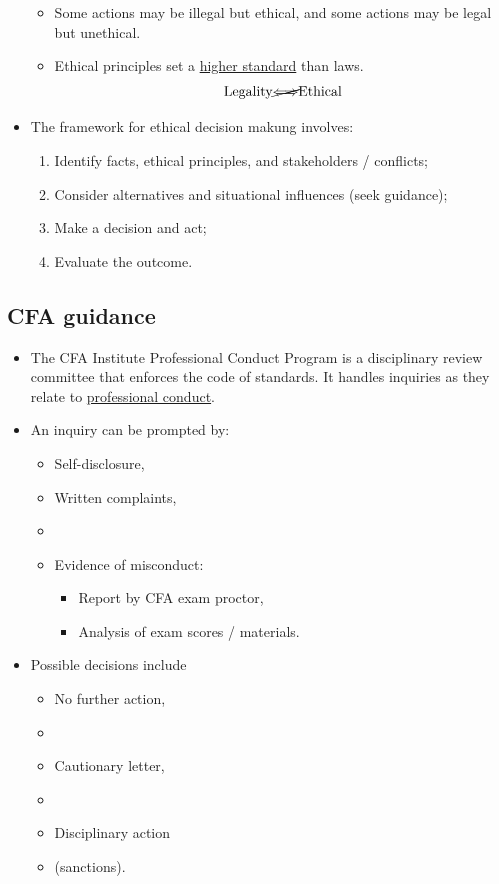 \documentclass[../notes_compiled.tex]{subfiles}
\begin{document}
\begin{itemize}
\begin{itemize}
\item Some actions may be illegal but ethical, and some actions may be legal but unethical.
\item[] Ethical principles set a \underline{higher standard} than laws.
\begin{equation*}
\text{Legality}\cancel\Longleftrightarrow\text{Ethical}
\end{equation*}
\end{itemize}
\item The framework for ethical decision makung involves:
\begin{enumerate}
\item Identify facts, ethical principles, and stakeholders / conflicts;
\item Consider alternatives and situational influences (seek guidance);
\item Make a decision and act;
\item Evaluate the outcome.
\end{enumerate}
\end{itemize}

\subsection{CFA guidance}
\begin{itemize}
\item The CFA Institute Professional Conduct Program is a disciplinary review committee that enforces the code of standards. It handles inquiries as they relate to \underline{professional conduct}.
\item An inquiry can be prompted by:
\begin{multicols}{2}
\begin{itemize}
\item Self-disclosure,
\item Written complaints,
\item[]
\item Evidence of misconduct:
\begin{itemize}
\item Report by CFA exam proctor,
\item Analysis of exam scores / materials.
\end{itemize}
\end{itemize}
\end{multicols}
\item Possible decisions include
\begin{multicols}{3}
\begin{itemize}
\item No further action,
\item[]
\item Cautionary letter,
\item[]
\item Disciplinary action
\item[] (sanctions).
\end{itemize}
\end{multicols}
\end{itemize}
\end{document}
